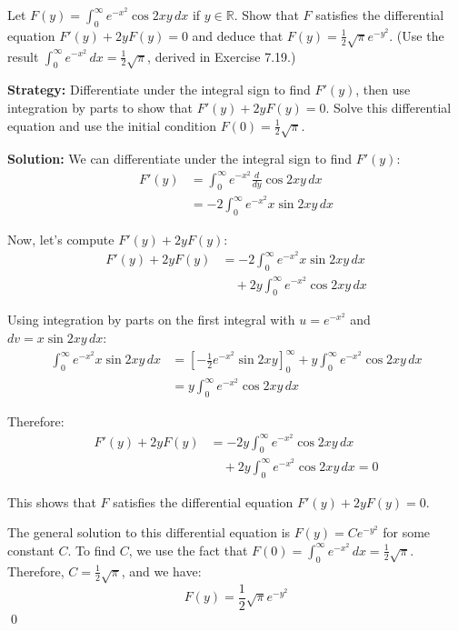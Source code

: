 \begin{problembox}
Let $F(y) = \int_{0}^{\infty} e^{-x^2} \cos 2xy \, dx$ if $y \in \mathbb{R}$. Show that $F$ satisfies the differential equation $F'(y) + 2y F(y) = 0$ and deduce that $F(y) = \frac{1}{2} \sqrt{\pi} e^{-y^2}$. (Use the result $\int_{0}^{\infty} e^{-x^2} \, dx = \frac{1}{2} \sqrt{\pi}$, derived in Exercise 7.19.)
\end{problembox}

\noindent\textbf{Strategy:} Differentiate under the integral sign to find $F'(y)$, then use integration by parts to show that $F'(y) + 2y F(y) = 0$. Solve this differential equation and use the initial condition $F(0) = \frac{1}{2} \sqrt{\pi}$.

\bigskip\noindent\textbf{Solution:}
We can differentiate under the integral sign to find $F'(y)$:
\begin{align*}
F'(y) &= \int_{0}^{\infty} e^{-x^2} \frac{d}{dy} \cos 2xy \, dx \\
&= -2 \int_{0}^{\infty} e^{-x^2} x \sin 2xy \, dx
\end{align*}

Now, let's compute $F'(y) + 2y F(y)$:
\begin{align*}
F'(y) + 2y F(y) &= -2 \int_{0}^{\infty} e^{-x^2} x \sin 2xy \, dx \\
&\quad + 2y \int_{0}^{\infty} e^{-x^2} \cos 2xy \, dx
\end{align*}

Using integration by parts on the first integral with $u = e^{-x^2}$ and $dv = x \sin 2xy \, dx$:
\begin{align*}
\int_{0}^{\infty} e^{-x^2} x \sin 2xy \, dx &= \left[-\frac{1}{2} e^{-x^2} \sin 2xy\right]_{0}^{\infty} + y \int_{0}^{\infty} e^{-x^2} \cos 2xy \, dx \\
&= y \int_{0}^{\infty} e^{-x^2} \cos 2xy \, dx
\end{align*}

Therefore:
\begin{align*}
F'(y) + 2y F(y) &= -2y \int_{0}^{\infty} e^{-x^2} \cos 2xy \, dx \\
&\quad + 2y \int_{0}^{\infty} e^{-x^2} \cos 2xy \, dx = 0
\end{align*}


This shows that $F$ satisfies the differential equation $F'(y) + 2y F(y) = 0$.

The general solution to this differential equation is $F(y) = C e^{-y^2}$ for some constant $C$. To find $C$, we use the fact that $F(0) = \int_{0}^{\infty} e^{-x^2} \, dx = \frac{1}{2} \sqrt{\pi}$. Therefore, $C = \frac{1}{2} \sqrt{\pi}$, and we have:
\[F(y) = \frac{1}{2} \sqrt{\pi} e^{-y^2}\]\qed



